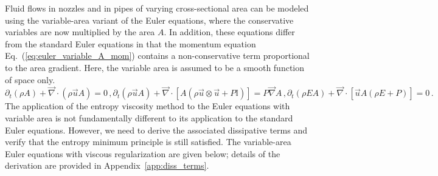\documentclass[review,10pt]{elsarticle}
\renewcommand{\div}{\vec{\nabla}\! \cdot \!}
\newcommand{\grad}{\vec{\nabla}}
\newcommand{\eqt}[1]{Eq.~(\ref{#1})}                     %
\newcommand{\app}[1]{Appendix~\ref{#1}}                   %
\newcommand{\tcr}[1]{\textcolor{red}{#1}}
\newcommand{\tcb}[1]{\textcolor{blue}{#1}}
\begin{document}
Fluid flows in nozzles and in pipes of varying cross-sectional area can be modeled using the variable-area 
variant of the Euler equations, where the conservative variables are now multiplied by the area $A$. 
In addition, these equations differ from the standard Euler equations in that the momentum equation 
\eqt{eq:euler_variable_A_mom} contains a non-conservative term proportional to the area gradient. 
Here, the variable area is assumed to be a smooth function of space only. 
\begin{subequations}
\label{eq:euler_variable_A}
\begin{equation}
\label{eq:euler_variable_A_continuity}
\partial_t \left( \rho A \right) + \div \left( \rho \vec{u} A \right) = 0 \,,
\end{equation}
%
\begin{equation}
\label{eq:euler_variable_A_mom}
\partial_t \left( \rho \vec{u} A \right) + \div \left[A\left( \rho \vec{u} \otimes \vec{u} + P \mathbb{I} \right) \right] = P \grad A \,,
\end{equation}
% 
\begin{equation}
\label{eq:euler_variable_A_energy}
\partial_t \left( \rho E A \right) + \div \left[ \vec{u} A \left( \rho E + P \right) \right] = 0 \,.
\end{equation}
\end{subequations}
%
The application of the entropy viscosity method to the Euler equations with variable area is not 
fundamentally different to its application to the standard Euler equations. However, we need to 
derive the associated dissipative terms and verify that the entropy minimum principle is still satisfied.  
The variable-area Euler equations with viscous regularization are given below; details of the derivation are provided in \app{app:diss_terms}.
%
\end{document}
